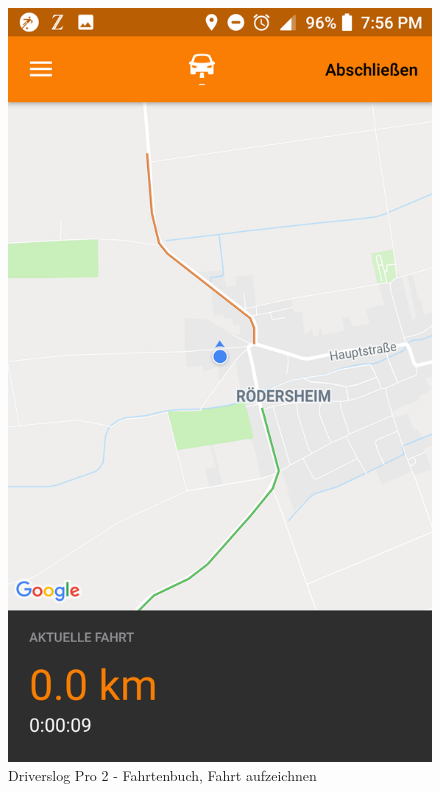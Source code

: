 \begin{figure}[H]%
    \begin{minipage}[b]{.4\linewidth} %
        \includegraphics[scale=0.12]{img/pro3}
        \caption{\label{img:img/pro3}Driverslog Pro 2 - Fahrtenbuch, Fahrt aufzeichnen}
    \end{minipage}
    \hspace{0.1\linewidth}%
    \begin{minipage}[b]{.4\linewidth} %

\end{minipage}
\end{figure}
